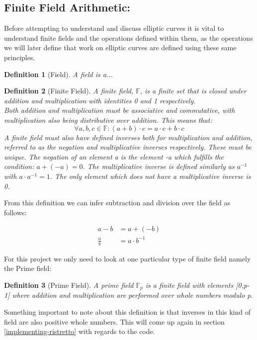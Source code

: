 \documentclass{article}
\newtheorem{definition}{Definition}[section]
\newcommand{\eq}[1]{\begin{equation*}\begin{split}#1\end{split}\end{equation*}}
\begin{document}
\subsection{Finite Field Arithmetic:} \label{Finite Field Arithmetic}

Before attempting to understand and discuss elliptic curves it is vital to understand finite fields and the operations defined within them, as the operations we will later define that work on elliptic curves are defined using these same principles.

\begin{definition}[Field]
	A field is a...
\end{definition}

\begin{definition}[Finite Field]
	A finite field, $\mathbb{F}$, is a finite set that is closed under addition and multiplication with identities 0 and 1 respectively.\\ Both addition and multiplication must be associative and commutative, with multiplication also being distributive over addition. This means that:
	$$\forall a,b,c \in \mathbb{F}: (a+b)\cdot c = a\cdot c + b\cdot c$$
	A finite field must also have defined inverses both for multiplication and addition, referred to as the negation and multiplicative inverses respectively. These must be unique. The negation of an element a is the element -a which fulfills the condition: $a + (-a) = 0$. The multiplicative inverse is defined similarly as $a^{-1}$ with $a\cdot a^{-1} = 1$. The only element which does not have a multiplicative inverse is 0.
\end{definition}

From this definition we can infer subtraction and division over the field as follows:

\eq{
	a-b         &= a + (-b) \\
	\frac{a}{b} &= a \cdot b^{-1}
}

For this project we only need to look at one particular type of finite field namely the Prime field:

\begin{definition}[Prime Field]
	A prime field $\mathbb{F}_p$ is a finite field with elements [0,p-1] where addition and multiplication are performed over whole numbers modulo p.
\end{definition}

Something important to note about this definition is that inverses in this kind of field are also positive whole numbers. This will come up again in section \ref{implementing-ristretto} with regards to the code.
\end{document}
